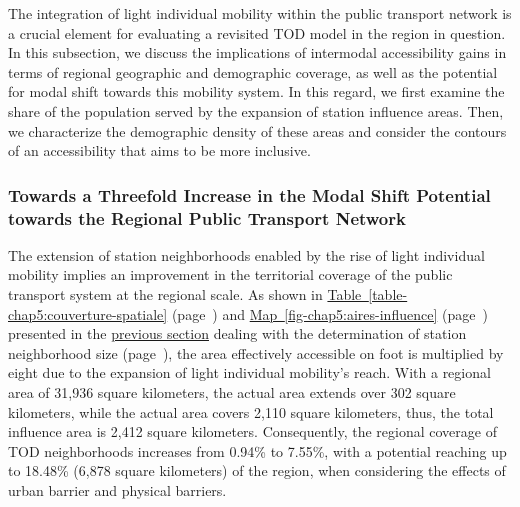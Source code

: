 \begin{refsegment}
The integration of light individual mobility within the public transport network is a crucial element for evaluating a revisited \acrshort{TOD} model in the region in question. In this subsection, we discuss the implications of intermodal accessibility gains in terms of regional geographic and demographic coverage, as well as the potential for modal shift towards this mobility system. In this regard, we first examine the share of the population served by the expansion of station influence areas. Then, we characterize the demographic density of these areas and consider the contours of an accessibility that aims to be more inclusive.%

\subsubsection*{Towards a Threefold Increase in the Modal Shift Potential towards the Regional Public Transport Network
    \label{chap5:couverture-regionale}
    }

The extension of station neighborhoods enabled by the rise of light individual mobility implies an improvement in the territorial coverage of the public transport system at the regional scale. As shown in \hyperref[table-chap5:couverture-spatiale]{Table~\ref{table-chap5:couverture-spatiale}} (page~\pageref{table-chap5:couverture-spatiale}) and \hyperref[fig-chap5:impedance-distances]{Map~\ref{fig-chap5:aires-influence}} (page~\pageref{fig-chap5:aires-influence}) presented in the \hyperref[chap5:taille-aire-secondaire]{previous section} dealing with the determination of station neighborhood size (page~\pageref{chap5:taille-aire-secondaire}), the area effectively accessible on foot is multiplied by eight due to the expansion of light individual mobility's reach. With a regional area of 31,936 square kilometers, the  actual area extends over 302 square kilometers, while the  actual area covers 2,110 square kilometers, thus, the total influence area is 2,412 square kilometers. Consequently, the regional coverage of \acrshort{TOD} neighborhoods increases from 0.94\% to 7.55\%, with a potential reaching up to 18.48\% (6,878 square kilometers) of the region, when considering the effects of \gls{urban barrier} and physical barriers.%


\end{refsegment}

